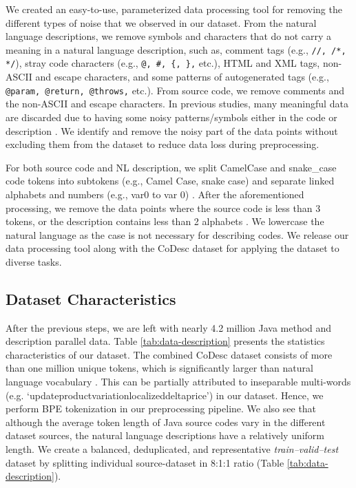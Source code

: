 \documentclass[11pt,a4paper]{article}
\begin{document}
We created an easy-to-use, parameterized data processing tool for removing the different types of noise that we observed in our dataset. From the natural language descriptions, we remove symbols and characters that do not carry a meaning in a natural language description, such as, comment tags (e.g., \texttt{//, /*, */}), stray code characters (e.g., \texttt{@, \#, \{, \},} etc.), HTML and XML tags,  non-ASCII and escape characters, and some patterns of autogenerated tags (e.g., \texttt{@param, @return, @throws,} etc.).
From source code, we remove comments and the non-ASCII and escape characters. In previous studies, many meaningful data are discarded due to having some noisy patterns/symbols either in the code or description \cite{husain2019codesearchnet,concode,funcom}. We identify and remove the noisy part of the data points without excluding them from the dataset to reduce data loss during preprocessing.


For both source code and NL description, we split CamelCase and snake\_case code tokens into subtokens (e.g., Camel Case, snake case) and separate linked alphabets and numbers (e.g., var0 to var 0) \cite{ncs, funcom}. After the aforementioned processing, we remove the data points where the source code is less than 3 tokens, or the description contains less than 2 alphabets \cite{husain2019codesearchnet}. We lowercase the natural language as the case is not necessary for describing codes. We release our data processing tool along with the CoDesc dataset for applying the dataset to diverse tasks.


\subsection{Dataset Characteristics}
After the previous steps, we are left with nearly 4.2 million Java method and description parallel data.
Table \ref{tab:data-description} presents the statistics characteristics of our dataset. The combined CoDesc dataset consists of more than one million unique tokens, which is significantly larger than natural language vocabulary \cite{nlp-vocab}. This can be partially attributed to inseparable multi-words (e.g. `updateproductvariationlocalizeddeltaprice') in our dataset. Hence, we perform BPE \cite{bpe} tokenization in our preprocessing pipeline. We also see that although the average token length of Java source codes vary in the different dataset sources, the natural language descriptions have a relatively uniform length. We create a balanced, deduplicated, and representative \textit{train--valid--test} dataset by splitting individual source-dataset in 8:1:1 ratio (Table \ref{tab:data-description}).
\end{document}
